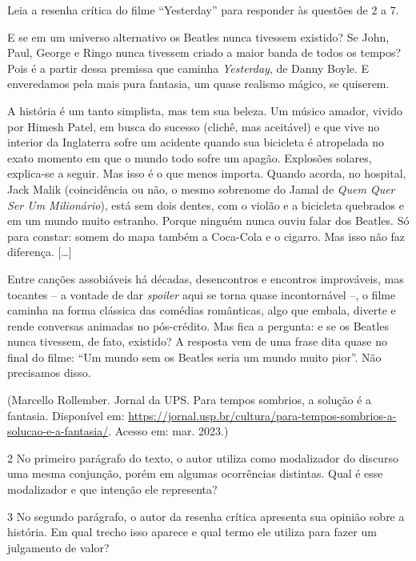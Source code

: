 Leia a resenha crítica do filme ``Yesterday'' para responder às questões
de 2 a 7.

E se em um universo alternativo os Beatles nunca tivessem existido? Se
John, Paul, George e Ringo nunca tivessem criado a maior banda de todos
os tempos? Pois é a partir dessa premissa que caminha \emph{Yesterday},
de Danny Boyle. E enveredamos pela mais pura fantasia, um quase realismo
mágico, se quiserem.

A história é um tanto simplista, mas tem sua beleza. Um músico amador,
vivido por Himesh Patel, em busca do sucesso (clichê, mas aceitável) e
que vive no interior da Inglaterra sofre um acidente quando sua
bicicleta é atropelada no exato momento em que o mundo todo sofre um
apagão. Explosões solares, explica-se a seguir. Mas isso é o que menos
importa. Quando acorda, no hospital, Jack Malik (coincidência ou não, o
mesmo sobrenome do Jamal de \emph{Quem Quer Ser Um Milionário}), está
sem dois dentes, com o violão e a bicicleta quebrados e em um mundo
muito estranho. Porque ninguém nunca ouviu falar dos Beatles. Só para
constar: somem do mapa também a Coca-Cola e o cigarro. Mas isso não faz
diferença. {[}\ldots{}{]}

Entre canções assobiáveis há décadas, desencontros e encontros
improváveis, mas tocantes -- a vontade de dar \emph{spoiler} aqui se
torna quase incontornável --, o filme caminha na forma clássica das
comédias românticas, algo que embala, diverte e rende conversas animadas
no pós-crédito. Mas fica a pergunta: e se os Beatles nunca tivessem, de
fato, existido? A resposta vem de uma frase dita quase no final do
filme: ``Um mundo sem os Beatles seria um mundo muito pior''. Não
precisamos disso.

(Marcello Rollember. Jornal da UPS. Para tempos sombrios, a solução é a
fantasia. Disponível em: 
\url{https://jornal.usp.br/cultura/para-tempos-sombrios-a-solucao-e-a-fantasia/}.
Acesso em: mar. 2023.)

\num{2} No primeiro parágrafo do texto, o autor utiliza como modalizador
do discurso uma mesma conjunção, porém em algumas ocorrências distintas.
Qual é esse modalizador e que intenção ele representa?



\num{3} No segundo parágrafo, o autor da resenha crítica apresenta sua
opinião sobre a história. Em qual trecho isso aparece e qual termo ele
utiliza para fazer um julgamento de valor?

